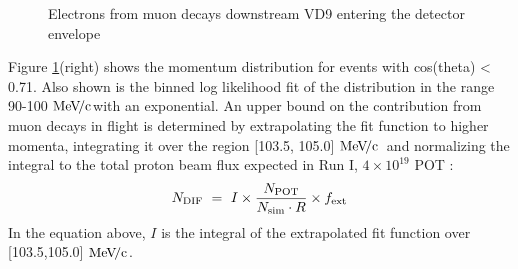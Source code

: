 \documentclass[12pt]{article}
\newcommand {\MeVc}       {\mbox{$\rm MeV\!/c$}}
\begin{document}
\begin{figure}[H]
  \hspace{-0.5in}
  \caption{
    \label{fig:bmum0sb8b0_cth_vs_mom}
    Electrons from muon decays downstream VD9 entering the detector envelope
  }
\end{figure}

Figure \ref{fig:bmum0sb8b0_cth_vs_mom}(right) shows the momentum distribution
for events with cos(theta) < 0.71. Also shown is the binned log likelihood fit
of the distribution in the range 90-100 \MeVc with an exponential. 
An upper bound on the contribution from muon decays in flight is determined
by extrapolating the fit function to higher momenta, integrating it over the
region [103.5, 105.0] \MeVc\ and normalizing the integral to the total proton
beam flux expected in Run I, $4 \times 10^{19}$ POT :
\begin{equation}
  \label{eqq_001}
N_{\rm DIF} ~=~ I \times {\frac{N_{\rm POT}}{N_{\rm sim} \cdot R}}  \times f_{\rm ext}
\end{equation}
In the equation above, $I$ is the integral of the extrapolated fit function over [103.5,105.0] \MeVc.
\end{document}
